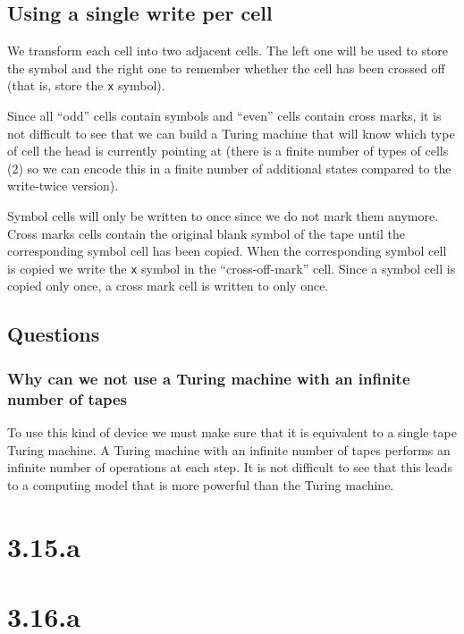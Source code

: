 \documentclass{article}
\begin{document}
\subsection*{Using a single write per cell}

We transform each cell into two adjacent cells. The left one will be used to
store the symbol and the right one to remember whether the cell has been
crossed off (that is, store the \texttt{x} symbol).

Since all ``odd'' cells contain symbols and ``even'' cells contain cross marks,
it is not difficult to see that we can build a Turing machine that will know
which type of cell the head is currently pointing at (there is a finite number
of types of cells (2) so we can encode this in a finite number of additional
states compared to the write-twice version).

Symbol cells will only be written to once since we do not mark them anymore.
Cross marks cells contain the original blank symbol of the tape until the
corresponding symbol cell has been copied. When the corresponding symbol cell
is copied we write the \texttt{x} symbol in the ``cross-off-mark'' cell. Since a symbol
cell is copied only once, a cross mark cell is written to only once.


\subsection*{Questions}
\subsubsection{Why can we not use a Turing machine with an infinite number of
tapes}
To use this kind of device we must make sure that it is equivalent to a single
tape Turing machine.
A Turing machine with an infinite number of tapes performs an infinite number
of operations at each step. It is not difficult to see that this leads to a
computing model that is more powerful than the Turing machine.
\section*{3.15.a}
\section*{3.16.a}
\end{document}
